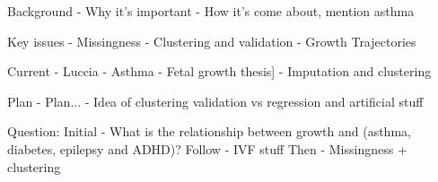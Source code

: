 

Background 	- Why it's important
			- How it's come about, mention asthma 

Key issues 	- Missingness
			- Clustering and validation
			- Growth Trajectories

Current 	- Luccia 
			- Asthma 
			- Fetal growth thesis]
			- Imputation and clustering

Plan 		- Plan... 
			- Idea of clustering validation vs regression and artificial stuff



Question:
	Initial - What is the relationship between growth and (asthma, diabetes, epilepsy and ADHD)?
	Follow  - IVF stuff 
	Then    - Missingness + clustering 

